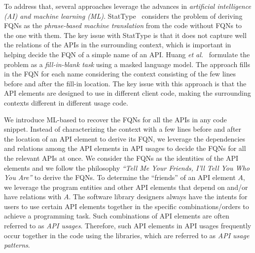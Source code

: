 To address that, several approaches leverage the advances in {\em
  artificial intelligence (AI) and machine learning
  (ML)}. StatType~\cite{icse18} considers the problem of deriving FQNs
as the {\em phrase-based machine translation} from the code without
FQNs to the one with them. The key issue with StatType is that it does
not capture well the relations of the APIs in the surrounding context,
which is important in helping decide the FQN of a simple name of an
API. Huang {\em et al.}~\cite{prompt-ase22} formulate the problem as a
{\em fill-in-blank task} using a masked language model. The approach
fills in the FQN for each name considering the context consisting of
the few lines before and after the fill-in location. The key issue
with this approach is that the API elements are designed to use in
different client code, making the surrounding contexts different in
different usage code.

We introduce ML-based {\tool} to recover the FQNs for all the APIs in
any code snippet. Instead of characterizing the context with a few
lines before and after the location of an API element to derive its
FQN, we leverage the dependencies and relations among the API elements
in API usages to decide the FQNs for all the relevant APIs at once. We
consider the FQNs as the identities of the API elements and we follow
the philosophy {\em ``Tell Me Your Friends, I'll Tell You Who You
  Are''} to derive the FQNs. To determine the ``friends'' of an API
element $A$, we leverage the program entities and other API elements
that depend on and/or have relations with $A$. The software library
designers always have the intents for users to use certain API
elements together in the specific combinations/orders to achieve a
programming task. Such combinations of API elements are often referred
to as {\em API usages}. Therefore, such API elements in API usages
frequently occur together in the code using the libraries, which are
referred to as {\em API usage patterns}.

